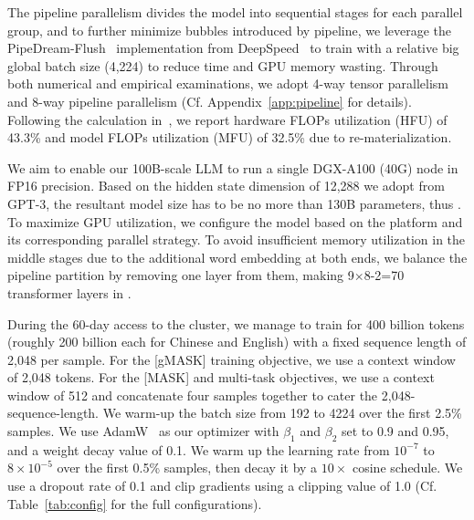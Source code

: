 The pipeline parallelism divides the model into sequential stages for each parallel group, and to further minimize bubbles introduced by pipeline, we leverage the PipeDream-Flush~\citep{narayanan2021memory} implementation from DeepSpeed~\citep{rasley2020deepspeed} to train \glm with a relative big global batch size (4,224) to reduce time and GPU memory wasting. 
Through both numerical and empirical examinations, we adopt 4-way tensor parallelism and 8-way pipeline parallelism (Cf. Appendix~\ref{app:pipeline} for details). Following the calculation in~\citep{chowdhery2022palm}, we report hardware FLOPs utilization (HFU) of 43.3\% and model FLOPs utilization (MFU) of 32.5\% due to re-materialization.

We aim to enable our 100B-scale LLM to run a single DGX-A100 (40G) node in FP16 precision. 
Based on the hidden state dimension of 12,288 we adopt from GPT-3, the resultant model size has to be no more than 130B parameters, thus \glm.
To maximize GPU utilization, we configure the model based on the platform and its corresponding parallel strategy. 
To avoid insufficient memory utilization in the middle stages
due to the additional word embedding at both ends, we balance the pipeline partition by removing one layer from them, making 9$\times$8-2=70 transformer layers in \glm.

During the 60-day access to the cluster, we manage to train \glm for 400 billion tokens (roughly 200 billion each for Chinese and English) with a fixed sequence length of 2,048 per sample. 
For the [gMASK] training objective, we use a context window of 2,048 tokens. 
For the [MASK] and multi-task objectives, we use a context window of 512 and concatenate four samples together to cater the 2,048-sequence-length. 
We warm-up the batch size from 192 to 4224 over the first 2.5\% samples. 
We use AdamW~\citep{loshchilov2017decoupled} as our optimizer with $\beta_1$ and $\beta_2$ set to 0.9 and 0.95, and a weight decay value of 0.1. 
We warm up the learning rate from $10^{-7}$ to $8\times 10^{-5}$ over the first 0.5\% samples, then decay it by a $10\times$ cosine schedule. 
We use a dropout rate of 0.1 and clip gradients using a clipping value of 1.0 (Cf. Table~\ref{tab:config} for the full configurations).

